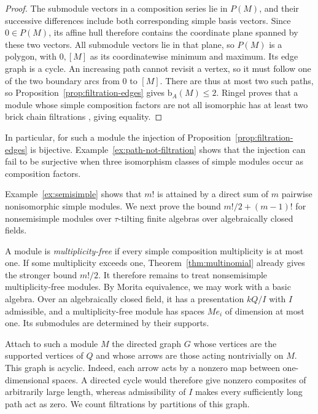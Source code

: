 \documentclass[a4paper,reqno,10pt]{amsart}
\theoremstyle{definition}
\numberwithin{equation}{section}
\newcommand{\bcount}{\mathrm b}
\begin{document}
\begin{proof}
The submodule vectors in a composition series lie in $P(M)$, and
their successive differences include both corresponding simple basis
vectors. Since $0\in P(M)$, its affine hull therefore contains the
coordinate plane spanned by these two vectors. All submodule vectors
lie in that plane, so $P(M)$ is a polygon, with $0,[M]$ as its
coordinatewise minimum and maximum. Its edge graph is a cycle.
An increasing path cannot revisit a vertex, so it must follow one
of the two boundary arcs from $0$ to $[M]$.
There are thus at most two such paths, so
Proposition~\ref{prop:filtration-edges} gives $\bcount_A(M)\leq2$.
Ringel proves that a module whose simple composition factors are not
all isomorphic has at least two brick chain filtrations
\cite[Proposition~10.3]{RingelFiltrations}, giving equality.
\end{proof}

In particular, for such a module the injection of
Proposition~\ref{prop:filtration-edges} is bijective.
Example~\ref{ex:path-not-filtration} shows that the injection can fail to be
surjective when three isomorphism classes of simple modules occur as
composition factors.

Example~\ref{ex:semisimple} shows that
$m!$ is attained by a direct sum of $m$ pairwise nonisomorphic simple
modules. We next prove the bound $m!/2+(m-1)!$ for nonsemisimple modules
over $\tau$-tilting finite algebras over algebraically closed fields.

A module is \emph{multiplicity-free} if every simple composition
multiplicity is at most one. If some multiplicity exceeds one,
Theorem~\ref{thm:multinomial} already gives the stronger bound $m!/2$.
It therefore remains to treat nonsemisimple multiplicity-free modules.
By Morita equivalence, we may work with a basic algebra. Over an
algebraically closed field, it has a presentation $kQ/I$ with $I$
admissible, and a multiplicity-free module has spaces $Me_i$ of
dimension at most one. Its submodules are determined by their supports.

Attach to such a module $M$ the directed graph $G$ whose vertices are
the supported vertices of $Q$ and whose arrows are those acting
nontrivially on $M$. This graph is acyclic. Indeed, each arrow acts
by a nonzero map between one-dimensional spaces. A directed cycle
would therefore give nonzero composites of arbitrarily large length,
whereas admissibility of $I$ makes every sufficiently long path act
as zero. We count filtrations by partitions of this graph.
\end{document}
